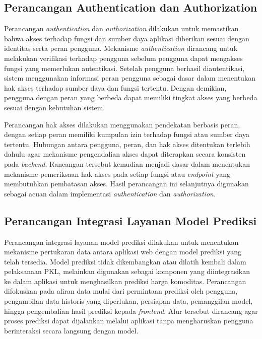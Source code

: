 \subsection{Perancangan Authentication dan Authorization}

Perancangan \textit{authentication} dan \textit{authorization} dilakukan untuk memastikan bahwa akses terhadap fungsi dan sumber daya aplikasi diberikan sesuai dengan identitas serta peran pengguna. Mekanisme \textit{authentication} dirancang untuk melakukan verifikasi terhadap pengguna sebelum pengguna dapat mengakses fungsi yang memerlukan autentikasi. Setelah pengguna berhasil diautentikasi, sistem menggunakan informasi peran pengguna sebagai dasar dalam menentukan hak akses terhadap sumber daya dan fungsi tertentu. Dengan demikian, pengguna dengan peran yang berbeda dapat memiliki tingkat akses yang berbeda sesuai dengan kebutuhan sistem.

Perancangan hak akses dilakukan menggunakan pendekatan berbasis peran, dengan setiap peran memiliki kumpulan izin terhadap fungsi atau sumber daya tertentu. Hubungan antara pengguna, peran, dan hak akses ditentukan terlebih dahulu agar mekanisme pengendalian akses dapat diterapkan secara konsisten pada \textit{backend}. Rancangan tersebut kemudian menjadi dasar dalam menentukan mekanisme pemeriksaan hak akses pada setiap fungsi atau \textit{endpoint} yang membutuhkan pembatasan akses. Hasil perancangan ini selanjutnya digunakan sebagai acuan dalam implementasi \textit{authentication} dan \textit{authorization}.

\subsection{Perancangan Integrasi Layanan Model Prediksi}

Perancangan integrasi layanan model prediksi dilakukan untuk menentukan mekanisme pertukaran data antara aplikasi web dengan model prediksi yang telah tersedia. Model prediksi tidak dikembangkan atau dilatih kembali dalam pelaksanaan PKL, melainkan digunakan sebagai komponen yang diintegrasikan ke dalam aplikasi untuk menghasilkan prediksi harga komoditas. Perancangan difokuskan pada aliran data mulai dari permintaan prediksi oleh pengguna, pengambilan data historis yang diperlukan, persiapan data, pemanggilan model, hingga pengembalian hasil prediksi kepada \textit{frontend}. Alur tersebut dirancang agar proses prediksi dapat dijalankan melalui aplikasi tanpa mengharuskan pengguna berinteraksi secara langsung dengan model.

